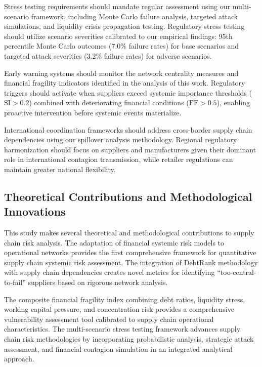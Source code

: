 \documentclass[a4 paper, 11pt,twoside]{article}
\newcommand{\0}{\Bf{0}}
\theoremstyle{definition}
\begin{document}
Stress testing requirements should mandate regular assessment using our multi-scenario framework, including Monte Carlo failure analysis, targeted attack simulations, and liquidity crisis propagation testing. Regulatory stress testing should utilize scenario severities calibrated to our empirical findings: 95th percentile Monte Carlo outcomes (7.0\% failure rates) for base scenarios and targeted attack severities (3.2\% failure rates) for adverse scenarios.

Early warning systems should monitor the network centrality measures and financial fragility indicators identified in the analysis of this work. Regulatory triggers should activate when suppliers exceed systemic importance thresholds ($\text{SI} > 0.2$) combined with deteriorating financial conditions ($\text{FF} > 0.5$), enabling proactive intervention before systemic events materialize.

International coordination frameworks should address cross-border supply chain dependencies using our spillover analysis methodology. Regional regulatory harmonization should focus on suppliers and manufacturers given their dominant role in international contagion transmission, while retailer regulations can maintain greater national flexibility.

\subsection{Theoretical Contributions and Methodological Innovations}

This study makes several theoretical and methodological contributions to supply chain risk analysis. The adaptation of financial systemic risk models to operational networks provides the first comprehensive framework for quantitative supply chain systemic risk assessment. The integration of DebtRank methodology with supply chain dependencies creates novel metrics for identifying ``too-central-to-fail'' suppliers based on rigorous network analysis.

The composite financial fragility index combining debt ratios, liquidity stress, working capital pressure, and concentration risk provides a comprehensive vulnerability assessment tool calibrated to supply chain operational characteristics. The multi-scenario stress testing framework advances supply chain risk methodologies by incorporating probabilistic analysis, strategic attack assessment, and financial contagion simulation in an integrated analytical approach.
\end{document}
